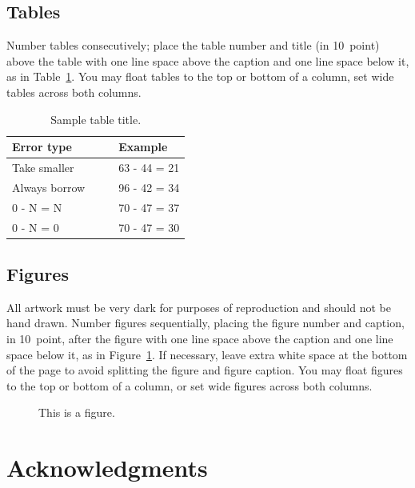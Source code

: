 \documentclass[10pt,letterpaper]{article}
\begin{document}
\subsection{Tables}

Number tables consecutively; place the table number and title (in
10~point) above the table with one line space above the caption and
one line space below it, as in Table~\ref{sample-table}. You may float
tables to the top or bottom of a column, set wide tables across both
columns.

\begin{table}[!ht]
\begin{center} 
\caption{Sample table title.} 
\label{sample-table} 
\vskip 0.12in
\begin{tabular}{ll} 
\hline
Error type    &  Example \\
\hline
Take smaller        &   63 - 44 = 21 \\
Always borrow~~~~   &   96 - 42 = 34 \\
0 - N = N           &   70 - 47 = 37 \\
0 - N = 0           &   70 - 47 = 30 \\
\hline
\end{tabular} 
\end{center} 
\end{table}


\subsection{Figures}

All artwork must be very dark for purposes of reproduction and should
not be hand drawn. Number figures sequentially, placing the figure
number and caption, in 10~point, after the figure with one line space
above the caption and one line space below it, as in
Figure~\ref{sample-figure}. If necessary, leave extra white space at
the bottom of the page to avoid splitting the figure and figure
caption. You may float figures to the top or bottom of a column, or
set wide figures across both columns.

\begin{figure}[ht]
\begin{center}
\end{center}
\caption{This is a figure.} 
\label{sample-figure}
\end{figure}


\section{Acknowledgments}
\end{document}
